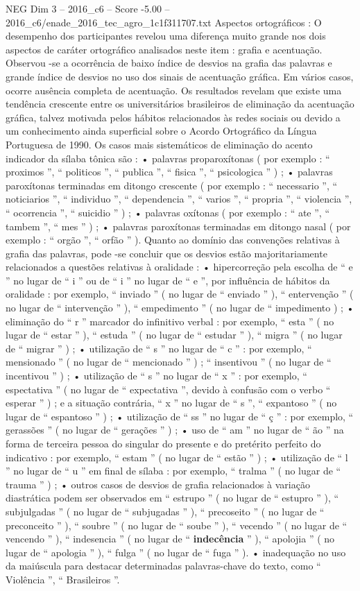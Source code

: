 \begin{textsample}{NEG Dim 3 – 2016\_c6 – Score -5.00 – 2016\_c6/enade\_2016\_tec\_agro\_1c1f311707.txt}
Aspectos ortográficos : O desempenho dos participantes revelou uma diferença muito grande nos dois aspectos de caráter ortográfico analisados neste item : grafia e acentuação.
Observou -se a ocorrência de baixo índice de desvios na grafia das palavras e grande índice de desvios no uso dos sinais de acentuação gráfica.
Em vários casos, ocorre ausência completa de acentuação.
Os resultados revelam que existe uma tendência crescente entre os universitários brasileiros de eliminação da acentuação gráfica, talvez motivada pelos hábitos relacionados às redes sociais ou devido a um conhecimento ainda superficial sobre o Acordo Ortográfico da Língua Portuguesa de 1990.
Os casos mais sistemáticos de eliminação do acento indicador da sílaba tônica são : • palavras proparoxítonas ( por exemplo : “ proximos ”, “ politicos ”, “ publica ”, “ fisica ”, “ psicologica ” ) ; • palavras paroxítonas terminadas em ditongo crescente ( por exemplo : “ necessario ”, “ noticiarios ”, “ individuo ”, “ dependencia ”, “ varios ”, “ propria ”, “ violencia ”, “ ocorrencia ”, “ suicidio ” ) ; • palavras oxítonas ( por exemplo : “ ate ”, “ tambem ”, “ mes ” ) ; • palavras paroxítonas terminadas em ditongo nasal ( por exemplo : “ orgão ”, “ orfão ” ).
Quanto ao domínio das convenções relativas à grafia das palavras, pode -se concluir que os desvios estão majoritariamente relacionados a questões relativas à oralidade : • hipercorreção pela escolha de “ e ” no lugar de “ i ” ou de “ i ” no lugar de “ e ”, por influência de hábitos da oralidade : por exemplo, “ inviado ” ( no lugar de “ enviado ” ), “ entervenção ” ( no lugar de “ intervenção ” ), “ empedimento ” ( no lugar de “ impedimento ) ; • eliminação do “ r ” marcador do infinitivo verbal : por exemplo, “ esta ” ( no lugar de “ estar ” ), “ estuda ” ( no lugar de “ estudar ” ), “ migra ” ( no lugar de “ migrar ” ) ; • utilização de “ s ” no lugar de “ c ” : por exemplo, “ mensionado ” ( no lugar de “ mencionado ” ) ; “ insentivou ” ( no lugar de “ incentivou ” ) ; • utilização de “ s ” no lugar de “ x ” : por exemplo, “ espectativa ” ( no lugar de “ expectativa ”, devido à confusão com o verbo “ esperar ” ) ; e a situação contrária, “ x ” no lugar de “ s ”, “ expantoso ” ( no lugar de “ espantoso ” ) ; • utilização de “ ss ” no lugar de “ ç ” : por exemplo, “ gerassões ” ( no lugar de “ gerações ” ) ; • uso de “ am ” no lugar de “ ão ” na forma de terceira pessoa do singular do presente e do pretérito perfeito do indicativo : por exemplo, “ estam ” ( no lugar de “ estão ” ) ; • utilização de “ l ” no lugar de “ u ” em final de sílaba : por exemplo, “ tralma ” ( no lugar de “ trauma ” ) ; • outros casos de desvios de grafia relacionados à variação diastrática podem ser observados em “ estrupo ” ( no lugar de “ estupro ” ), “ subjulgadas ” ( no lugar de “ subjugadas ” ), “ precoseito ” ( no lugar de “ preconceito ” ), “ soubre ” ( no lugar de “ soube ” ), “ vecendo ” ( no lugar de “ vencendo ” ), “ indesencia ” ( no lugar de “ \textbf{indecência} ” ), “ apolojia ” ( no lugar de “ apologia ” ), “ fulga ” ( no lugar de “ fuga ” ). • inadequação no uso da maiúscula para destacar determinadas palavras-chave do texto, como “ Violência ”, “ Brasileiros ”.

\end{textsample}
